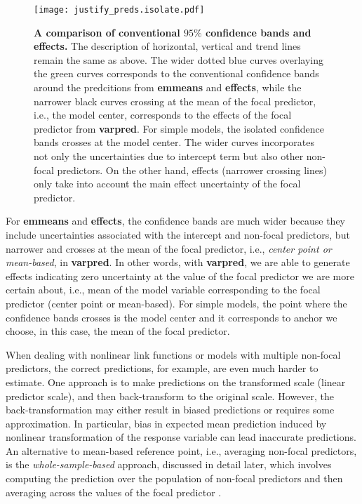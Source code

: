 \documentclass[10pt,letterpaper]{article}
\newcommand{\pkg}[1]{\textbf{#1}}
\begin{document}
\begin{figure}[!h]
\centering
\texttt{[image: justify\_preds.isolate.pdf]}
\caption{{\bf A comparison of conventional $95\%$ confidence bands and effects.} The description of horizontal, vertical and trend lines remain the same as above. The wider dotted blue curves overlaying the green curves corresponds to the conventional confidence bands around the predcitions from \pkg{emmeans} and \pkg{effects}, while the narrower black curves crossing at the mean of the focal predictor, i.e., the model center, corresponds to the effects of the focal predictor from \pkg{varpred}. For simple models, the isolated confidence bands crosses at the model center. The wider curves incorporates not only the uncertainties due to intercept term but also other non-focal predictors. On the other hand, effects (narrower crossing lines) only take into account the main effect uncertainty of the focal predictor.}
\label{fig:justify_ci_plots}
\end{figure}

For \pkg{emmeans} and \pkg{effects}, the confidence bands are much wider because they include uncertainties associated with the intercept and non-focal predictors, but narrower and crosses at the mean of the focal predictor, i.e., \emph{center point or mean-based}, in \pkg{varpred}. In other words, with \pkg{varpred}, we are able to generate effects indicating zero uncertainty at the value of the focal predictor we are more certain about, i.e., mean of the model variable corresponding to the focal predictor (center point or mean-based). For simple models, the point where the confidence bands crosses is the model center and it corresponds to anchor we choose, in this case, the mean of the focal predictor.


When dealing with nonlinear link functions or models with multiple non-focal predictors, the correct predictions, for example, are even much harder to estimate. One approach is to make predictions on the transformed scale (linear predictor scale), and then back-transform to the original scale. However, the back-transformation may either result in biased predictions or requires some approximation. In particular, bias in expected mean prediction induced by nonlinear transformation of the response variable can lead inaccurate predictions. An alternative to mean-based reference point, i.e., averaging non-focal predictors, is the \emph{whole-sample-based} approach, discussed in detail later, which involves computing the prediction over the population of non-focal predictors and then averaging across the values of the focal predictor \cite{hanmer2013behind}. 
\end{document}
